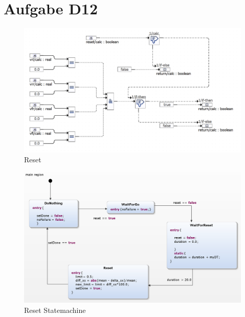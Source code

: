 
\chapter{Aufgabe D12}

\begin{figure}[h!]
	\centering
	\includegraphics[width=1\linewidth]{../Graphiken/Reset.png}
	\caption{Reset}
	\label{fig:Reset}
\end{figure}

\begin{figure}[h!]
	\centering
	\includegraphics[width=1\linewidth]{../Graphiken/ResetStateMachine.png}
	\caption{Reset Statemachine}
	\label{fig:ResetStateMachine}
\end{figure}